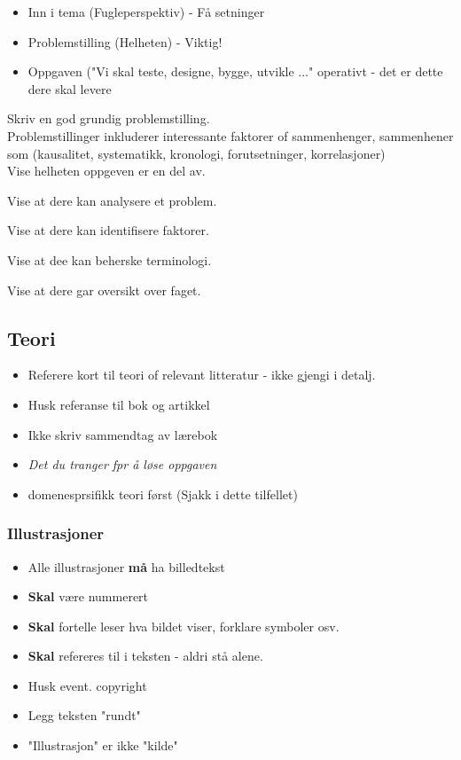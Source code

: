 \begin{itemize}
    \item Inn i tema (Fugleperspektiv) - Få setninger

    \item Problemstilling (Helheten) - Viktig!

    \item Oppgaven ("Vi skal teste, designe, bygge, utvikle ..." operativt - det er dette dere skal levere
\end{itemize}

Skriv en god grundig problemstilling. \\

Problemstillinger inkluderer interessante faktorer of sammenhenger, sammenhener som (kausalitet, systematikk, kronologi, forutsetninger, korrelasjoner) \\

Vise helheten oppgeven er en del av. 

Vise at dere kan analysere et problem. 

Vise at dere kan identifisere faktorer.

Vise at dee kan beherske terminologi.

Vise at dere gar oversikt over faget.

\subsection*{Teori}

\begin{itemize}
    \item Referere kort til teori of relevant litteratur - ikke gjengi i detalj.
    \item Husk referanse til bok og artikkel
    \item Ikke skriv sammendtag av lærebok
    \item \textit{Det du tranger fpr å løse oppgaven}
    \item domenesprsifikk teori først (Sjakk i dette tilfellet)
\end{itemize}

\subsubsection*{Illustrasjoner}

\begin{itemize}
    \item Alle illustrasjoner \textbf{må} ha billedtekst 
    \item \textbf{Skal} være nummerert 
    \item \textbf{Skal} fortelle leser hva bildet viser, forklare symboler osv. 
    \item \textbf{Skal} refereres til i teksten - aldri stå alene. 
    \item Husk event. copyright 
    \item Legg teksten "rundt" 
    \item "Illustrasjon" er ikke "kilde"
\end{itemize}

